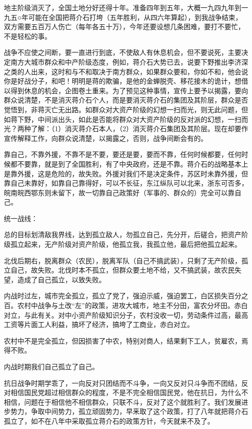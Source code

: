 地主阶级消灭了，全国土地分好还得十年。准备四年到五年，大概一九四九年到一九五○年可能在全国把蒋介石打垮（五年胜利，从四六年算起），到我战争结束，双方需要五百万人伤亡（每年各五十万），今年还要设想几条困难，要打不要忙，不是轻松的事。

战争不应使之间断，要一直进行到底，不使敌人有休息机会，但不要说死，主要决定南方大城市群众和中产阶级态度，例如，蒋介石大势已去，说要下野推出李济深之类的人出来，这时和与不和取决于南方群众，如果群众要和，你如不和，他会说你是好战分子，和吧！明明是蒋的欺骗，是他的金蝉脱壳、移花接木的诡计，想借以得到休息的机会，企图卷土重来。为了预见这种事情，宣传上要予以揭露，要向群众说清楚，不是消灭蒋介石个人，而是要消灭蒋介石的集团及其阶层，群众是否觉悟到，非蒋灭亡无出路。如群众对大资产阶级的幻想一扫而光，则无此问题，但如蒋下野，中间派出头，如此是否能将群众对大资产阶级的反对派的幻想，一扫而光？两种了解：（1）消灭蒋介石本人，（2）消灭蒋介石集团及其阶层。现在却要作宣传解释工作，向群众说清楚，以揭露之，否则，战争间断会有的。

靠自己，不靠外援，不靠不是不要，要还是要，要而不靠，任何时候都要，任何时候都不要靠，就是到了全国胜利，有了中央政府，还是不靠。蒋介石的战略基本上是靠外援，这是危险的，故失败。外援对我们不是决定条件，苏区时未靠外援，但靠自己未靠好，如靠自己靠得好，可以不长征，东江纵队可以北来，浙东可否多，皖南皖西鄂东则未留下，故一切靠自己政策好（军事的、群众的）完全可以靠自己。

统一战线：

总的目标划清敌我界线，达到孤立敌人，勿孤立自己，先分开，后磋合，把资产阶级孤立起来，无产阶级对资产阶级，他孤立我，我孤立他，最后把他孤立起来。

北伐后期右，脱离群众（农民），脱离军队（自己不搞武装），只剩了无产阶级，孤立自己，故失败。北伐时本不孤立，但群众要土地不给，又不搞武装，故农民失望，造成了自己孤立，以致失败。

内战时过左，城市完全孤立，孤立了党了，强迫示威，强迫罢工，白区损失百分之百。农村中战争与土改“左”的政策，进攻大城市，地主不分田，富农分坏田。赤白对立，与此有关。对中小资产阶级知识分子，农村没收一切，劳动条件过高，最高工资等片面工人利益，搞坏了经济，搞垮了工商业，赤白对立。

农村中不是完全孤立，但因损害了中农，特别对商人，结果剩下工人，贫雇农，焉得不败。

内战时期我们自己孤立了自己。

抗日战争时期学乖了，一向反对只团结而不斗争，一向又反对只斗争而不团结，反对相信国民党超过相信群众的程度，不是不完全相信国民党，他在抗日，为什么不相信，问题在于相信他不相信群众，只联不斗，反对了这个就胜利了。我们发展进步势力，争取中间势力，孤立顽固势力，早釆取了这个政策，打了八年就把蒋介石孤立了，如不在八年中采取孤立蒋介石的政策方针，今天就来不及了。

